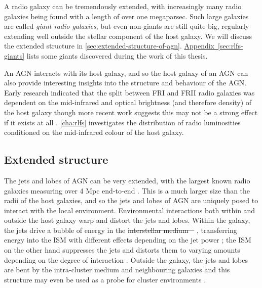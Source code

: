 \documentclass[11pt, a4paper]{book}
\newcommand{\aref}[1]{\hyperref[#1]{Appendix~\ref{#1}}}
\newcommand{\defn}[1]{\emph{#1}}
\providecommand{\DIFaddtex}[1]{{\protect\color{blue}\uwave{#1}}} %
\providecommand{\DIFdeltex}[1]{{\protect\color{red}\sout{#1}}}                      %
\providecommand{\DIFaddbegin}{} %
\providecommand{\DIFaddend}{} %
\providecommand{\DIFdelbegin}{} %
\providecommand{\DIFdelend}{} %
\providecommand{\DIFadd}[1]{\texorpdfstring{\DIFaddtex{#1}}{#1}} %
\providecommand{\DIFdel}[1]{\texorpdfstring{\DIFdeltex{#1}}{}} %
\newcommand{\DIFscaledelfig}{0.5}
\newlength{\DIFdelgraphicswidth} %
\newlength{\DIFdelgraphicsheight} %
\newcommand{\DIFaddincludegraphics}[2][]{{\color{blue}\fbox{\DIFOincludegraphics[#1]{#2}}}} %
\newcommand{\DIFdelincludegraphics}[2][]{%
\sbox{\DIFdelgraphicsbox}{\DIFOincludegraphics[#1]{#2}}%
\settoboxwidth{\DIFdelgraphicswidth}{\DIFdelgraphicsbox} %
\settoboxtotalheight{\DIFdelgraphicsheight}{\DIFdelgraphicsbox} %
\scalebox{\DIFscaledelfig}{%
\parbox[b]{\DIFdelgraphicswidth}{\usebox{\DIFdelgraphicsbox}\\[-\baselineskip] \rule{\DIFdelgraphicswidth}{0em}}\llap{\resizebox{\DIFdelgraphicswidth}{\DIFdelgraphicsheight}{%
\setlength{\unitlength}{\DIFdelgraphicswidth}%
\begin{picture}(1,1)%
\thicklines\linethickness{2pt} %
{\color[rgb]{1,0,0}\put(0,0){\framebox(1,1){}}}%
{\color[rgb]{1,0,0}\put(0,0){\line( 1,1){1}}}%
{\color[rgb]{1,0,0}\put(0,1){\line(1,-1){1}}}%
\end{picture}%
}\hspace*{3pt}}} %
} %
\DeclareRobustCommand{\DIFaddbegin}{\DIFOaddbegin \let\includegraphics\DIFaddincludegraphics} %
\DeclareRobustCommand{\DIFaddend}{\DIFOaddend \let\includegraphics\DIFOincludegraphics} %
\DeclareRobustCommand{\DIFdelbegin}{\DIFOdelbegin \let\includegraphics\DIFdelincludegraphics} %
\DeclareRobustCommand{\DIFdelend}{\DIFOaddend \let\includegraphics\DIFOincludegraphics} %
\begin{document}
        A radio galaxy can be tremendously extended, with increasingly many radio galaxies being found with a length of over one megaparsec. Such large galaxies are called \defn{giant radio galaxies}, but even non-giants are still quite big, regularly extending well outside the stellar component of the host galaxy. We will discuss the extended structure in \autoref{sec:extended-structure-of-agn}. \DIFdelbegin %
\DIFdelend \DIFaddbegin \aref{sec:rlfs-giants} \DIFaddend lists some giants discovered during the work of this thesis.

        An AGN interacts with its host galaxy, and so the host galaxy of an AGN can also provide interesting insights into the structure and behaviour of the AGN. Early research indicated that the split between FRI and FRII radio galaxies was dependent on the mid-infrared and optical brightness (and therefore density) of the host galaxy \citep{ledlow_20_1996,bicknell_relativistic_1995} though more recent work suggests this may not be a strong effect if it exists at all \citep{hardcastle20feedback}. \autoref{cha:rlfs} investigates the distribution of radio luminosities conditioned on the mid-infrared colour of the host galaxy.

    \subsection{Extended structure}
    \label{sec:extended-structure-of-agn}

        The jets and lobes of AGN can be very extended, with the largest known radio galaxies measuring over 4 Mpc end-to-end \citep{machalski_understanding_2011}. This is a much larger size than the radii of the host galaxies, and so the jets and lobes of AGN are uniquely posed to interact with the local environment. Environmental interactions both within and outside the host galaxy warp and distort the jets and lobes. Within the galaxy, the jets drive a bubble of energy in the \DIFdelbegin \DIFdel{interstellar medium \mbox{%
\citep[ISM;][]{mukherjee_relativistic_2016}}\hspace{0pt}%
}\DIFdelend \DIFaddbegin \DIFadd{ISM \mbox{%
\citep{mukherjee_relativistic_2016}}\hspace{0pt}%
}\DIFaddend , transferring energy into the ISM with different effects depending on the jet power \citep{mukherjee_relativistic_2018}; the ISM on the other hand suppresses the jets and distorts them to varying amounts depending on the degree of interaction \citep{mukherjee_relativistic_2018}. Outside the galaxy, the jets and lobes are bent by the intra-cluster medium and neighbouring galaxies \citep[ICM;][]{garon19bending,rodman19asymmetry} and this structure may even be used as a probe for cluster environments \citep{banfield_radio_2016,sakelliou_3c40_2008}.
\end{document}
